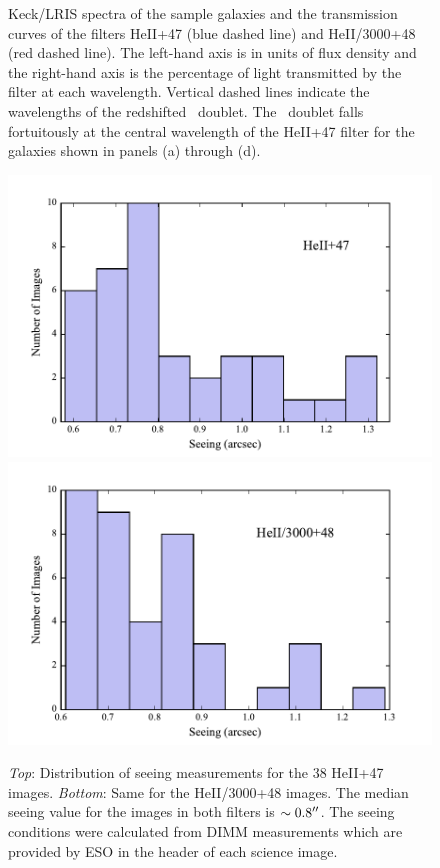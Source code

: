 \documentclass[twocolumn]{aastex62}
\begin{document}
\begin{figure}[!h]
\centering
{}
\caption{Keck/LRIS spectra of the sample galaxies and the transmission curves of the filters HeII+47 (blue dashed line) and HeII/3000+48 (red dashed line). The left-hand axis is in units of flux density and the right-hand axis is the percentage of light transmitted by the filter at each wavelength. Vertical dashed lines indicate the wavelengths of the redshifted \ doublet. The \ doublet falls fortuitously at the central wavelength of the HeII+47 filter for the galaxies shown in panels (a) through (d).}
\label{fig:spec_images}
\end{figure}

\begin{figure}[h]
\centering
\includegraphics[scale=.55]{avg_seeing_HEII.pdf}
\includegraphics[scale=.55]{avg_seeing_HEII3000.pdf}
\caption{\emph{Top}: Distribution of seeing measurements for the 38 HeII+47 images.
\emph{Bottom}: Same for the HeII/3000+48 images. The median seeing value for the images in both filters is $\sim 0.8\mbox{$^{\prime\prime}$}$. 
The seeing conditions were calculated from DIMM measurements which are provided by ESO in the header of each science image.
\label{fig.seeing}}
\end{figure}
\end{document}
